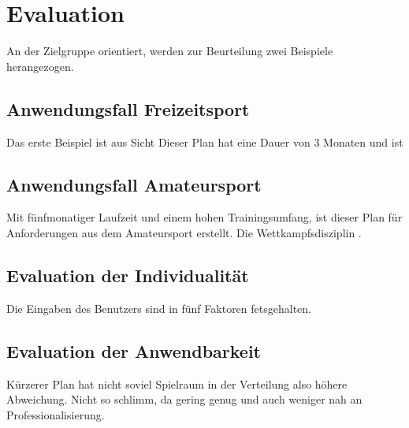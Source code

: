 \chapter{Evaluation}
\label{sec:evaluation}
An der Zielgruppe orientiert, werden zur Beurteilung zwei Beispiele herangezogen.
\section{Anwendungsfall Freizeitsport}
Das erste Beispiel ist aus Sicht 
Dieser Plan hat eine Dauer von 3 Monaten und ist 
\section{Anwendungsfall Amateursport}
Mit fünfmonatiger Laufzeit und einem hohen Trainingsumfang, ist dieser Plan für Anforderungen aus dem Amateursport erstellt. Die Wettkampfsdisziplin .

\section{Evaluation der Individualität}
Die Eingaben des Benutzers sind in fünf Faktoren fetsgehalten. 

\section{Evaluation der Anwendbarkeit}
Kürzerer Plan hat nicht soviel Spielraum in der Verteilung also höhere Abweichung. Nicht so schlimm, da gering genug und auch weniger nah an Professionalisierung.
